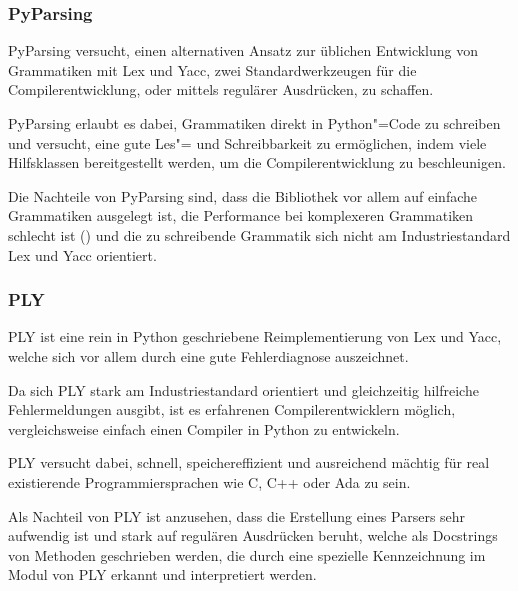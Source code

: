             \subsubsection{PyParsing}
                PyParsing versucht,
                einen alternativen Ansatz zur üblichen Entwicklung von Grammatiken mit Lex und
                \gls{Yacc},
                zwei Standardwerkzeugen für die Compilerentwicklung,
                oder
                mittels regulärer Ausdrücken,
                zu schaffen.\cite{McGuire2018}

                PyParsing erlaubt es dabei,
                Grammatiken direkt in Python"=Code zu schreiben und
                versucht,
                eine gute Les"= und
                Schreibbarkeit zu ermöglichen,
                indem viele Hilfsklassen bereitgestellt werden,
                um die Compilerentwicklung zu beschleunigen.

                Die Nachteile von PyParsing sind,
                dass die Bibliothek vor allem auf einfache Grammatiken ausgelegt ist,
                die Performance bei komplexeren Grammatiken schlecht ist
                (\cite{McGuire2018a}) und
                die zu schreibende Grammatik sich nicht am Industriestandard Lex und
                \gls{Yacc} orientiert.

            \subsubsection{PLY}
                \gls{PLY} ist eine rein in Python geschriebene Reimplementierung von Lex und
                \gls{Yacc},
                welche sich vor allem durch eine gute Fehlerdiagnose auszeichnet.\cite{Beazley2018}

                Da sich
                \gls{PLY} stark am Industriestandard orientiert und
                gleichzeitig hilfreiche Fehlermeldungen ausgibt,
                ist es erfahrenen Compilerentwicklern möglich,
                vergleichsweise einfach einen Compiler in Python zu entwickeln.

                \gls{PLY} versucht dabei,
                schnell,
                speichereffizient und
                ausreichend mächtig für real existierende Programmiersprachen wie
                C,
                C++ oder
                Ada zu sein.\cite{Beazley2018}

                Als Nachteil von
                \gls{PLY} ist anzusehen,
                dass die Erstellung eines Parsers sehr aufwendig ist und
                stark auf regulären Ausdrücken beruht,
                welche als Docstrings von Methoden geschrieben werden,
                die durch eine spezielle Kennzeichnung im Modul von
                \gls{PLY} erkannt und
                interpretiert werden.

